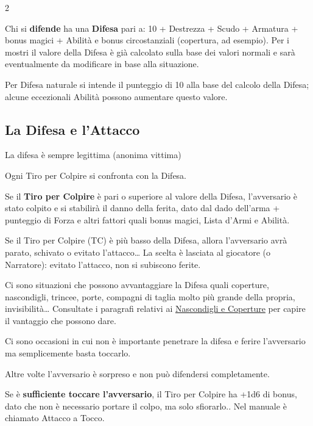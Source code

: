 \begin{multicols}{2}

Chi si \textbf{difende} ha una \textbf{Difesa} pari a: 10 + Destrezza + Scudo + Armatura + bonus magici + Abilità e bonus circostanziali (copertura, ad esempio). Per i mostri il valore della Difesa è già calcolato sulla base dei valori normali e sarà eventualmente da modificare in base alla situazione.

Per Difesa naturale si intende il punteggio di 10 alla base del calcolo della Difesa; alcune eccezionali Abilità possono aumentare questo valore.

\subsection{La Difesa e l'Attacco}\label{difesaeattacco}

\begin{enfasi}{La difesa è sempre legittima (anonima vittima)}\end{enfasi}

Ogni Tiro per Colpire si confronta con la Difesa.

Se il \textbf{Tiro per Colpire} è pari o superiore al valore della Difesa, l'avversario è stato colpito e si stabilirà il danno della ferita, dato dal dado dell'arma + punteggio di Forza e altri fattori quali bonus magici, Lista d'Armi e Abilità.

Se il Tiro per Colpire (TC) è più basso della Difesa, allora l'avversario avrà parato, schivato o evitato l'attacco… La scelta è lasciata al giocatore (o Narratore): evitato l'attacco, non si subiscono ferite.

Ci sono situazioni che possono avvantaggiare la Difesa quali coperture, nascondigli, trincee, porte, compagni di taglia molto più grande della propria, invisibilità… Consultate i paragrafi relativi ai \hyperlink{copertura}{Nascondigli e Coperture} per capire il vantaggio che possono dare.

Ci sono occasioni in cui non è importante penetrare la difesa e ferire l'avversario ma semplicemente basta toccarlo.

Altre volte l'avversario è sorpreso e non può difendersi completamente.

Se è \textbf{sufficiente toccare l'avversario}, il Tiro per Colpire ha +1d6 di bonus, dato che non è necessario portare il colpo, ma solo sfiorarlo.. Nel manuale è chiamato Attacco a Tocco.\label{attaccoatocco}\hypertarget{attaccoatocco}{}\label{difesaatocco}


\end{multicols}
